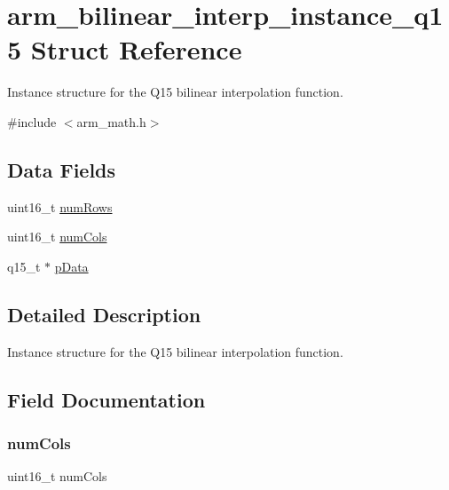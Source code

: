 \hypertarget{structarm__bilinear__interp__instance__q15}{}\section{arm\+\_\+bilinear\+\_\+interp\+\_\+instance\+\_\+q15 Struct Reference}
\label{structarm__bilinear__interp__instance__q15}


Instance structure for the Q15 bilinear interpolation function.  




{\ttfamily \#include $<$arm\+\_\+math.\+h$>$}

\subsection*{Data Fields}
\begin{DoxyCompactItemize}
\item 
uint16\+\_\+t \mbox{\hyperlink{structarm__bilinear__interp__instance__q15_a1bcf80ccdc2acc29198f1592ae300390}{num\+Rows}}
\item 
uint16\+\_\+t \mbox{\hyperlink{structarm__bilinear__interp__instance__q15_a4bb5ec0d13eb4c9cf887aa8366a44117}{num\+Cols}}
\item 
q15\+\_\+t $\ast$ \mbox{\hyperlink{structarm__bilinear__interp__instance__q15_a817ede38365e63e561a12069c6c5c087}{p\+Data}}
\end{DoxyCompactItemize}


\subsection{Detailed Description}
Instance structure for the Q15 bilinear interpolation function. 

\subsection{Field Documentation}
\mbox{\label{structarm__bilinear__interp__instance__q15_a4bb5ec0d13eb4c9cf887aa8366a44117}} 
\subsubsection{\texorpdfstring{numCols}{numCols}}
{\footnotesize\ttfamily uint16\+\_\+t num\+Cols}

